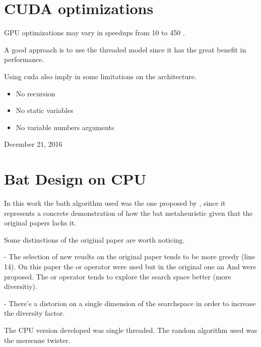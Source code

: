 \documentclass[conference]{IEEEtran}
\begin{document}
\section{CUDA optimizations}

GPU optimizations may vary in speedups from 10 to 450 \cite{gpuOptimization}.

A good approach is to use the threaded model since it has the great benefit in performance.

Using cuda also imply in  some limitations on the architecture.

\begin{itemize}
\item No recursion
\item No static variables
\item No variable numbers arguments
\end{itemize}


\hfill December 21, 2016

\section{Bat Design on CPU}

In this work the bath algorithm used was the one proposed by
\cite{parpinelli}, since it represents a concrete demonstration of how
the bat metaheuristic given that the original papers lacks it.

Some distinctions of the original paper are worth noticing.

- The selection of new reuslts on the original paper tends to be more greedy (line 14).
On this paper the or operator were used but in the original one an And were proposed.
The or operator tends to explore the search space better (more diversitiy).

- There's a distorion on a single dimension of the searchspace in order to increase the diversity factor.

The CPU version developed was single threaded.
The random algorithm used was the mersenne twister.
\end{document}
